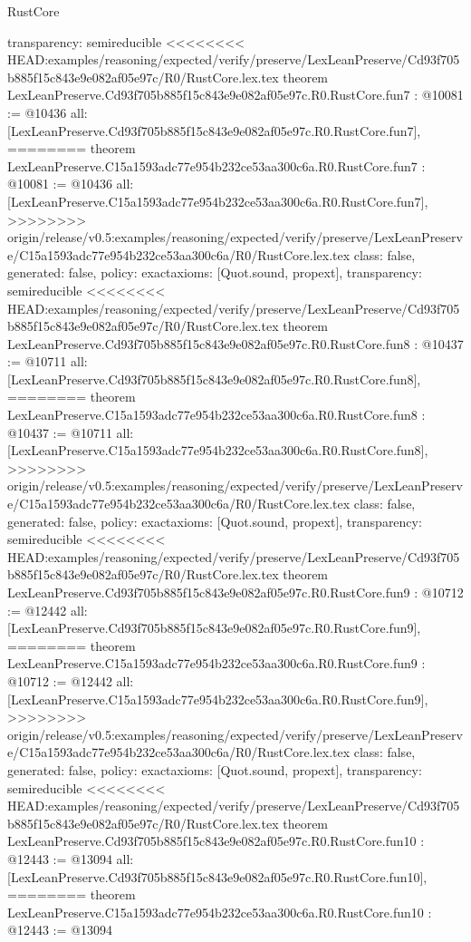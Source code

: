 \begin{lexlean}{RustCore}
\begin{coremodule}
{\begin{coremodule}
{{{{{{{{{{  transparency: semireducible
}
<<<<<<<< HEAD:examples/reasoning/expected/verify/preserve/LexLeanPreserve/Cd93f705b885f15c843e9e082af05e97c/R0/RustCore.lex.tex
theorem LexLeanPreserve.Cd93f705b885f15c843e9e082af05e97c.R0.RustCore.fun7 : @10081 := @10436 {
  all: [LexLeanPreserve.Cd93f705b885f15c843e9e082af05e97c.R0.RustCore.fun7],
========
theorem LexLeanPreserve.C15a1593adc77e954b232ce53aa300c6a.R0.RustCore.fun7 : @10081 := @10436 {
  all: [LexLeanPreserve.C15a1593adc77e954b232ce53aa300c6a.R0.RustCore.fun7],
>>>>>>>> origin/release/v0.5:examples/reasoning/expected/verify/preserve/LexLeanPreserve/C15a1593adc77e954b232ce53aa300c6a/R0/RustCore.lex.tex
  class: false,
  generated: false,
  policy: exact{axioms: [Quot.sound, propext]},
  transparency: semireducible
}
<<<<<<<< HEAD:examples/reasoning/expected/verify/preserve/LexLeanPreserve/Cd93f705b885f15c843e9e082af05e97c/R0/RustCore.lex.tex
theorem LexLeanPreserve.Cd93f705b885f15c843e9e082af05e97c.R0.RustCore.fun8 : @10437 := @10711 {
  all: [LexLeanPreserve.Cd93f705b885f15c843e9e082af05e97c.R0.RustCore.fun8],
========
theorem LexLeanPreserve.C15a1593adc77e954b232ce53aa300c6a.R0.RustCore.fun8 : @10437 := @10711 {
  all: [LexLeanPreserve.C15a1593adc77e954b232ce53aa300c6a.R0.RustCore.fun8],
>>>>>>>> origin/release/v0.5:examples/reasoning/expected/verify/preserve/LexLeanPreserve/C15a1593adc77e954b232ce53aa300c6a/R0/RustCore.lex.tex
  class: false,
  generated: false,
  policy: exact{axioms: [Quot.sound, propext]},
  transparency: semireducible
}
<<<<<<<< HEAD:examples/reasoning/expected/verify/preserve/LexLeanPreserve/Cd93f705b885f15c843e9e082af05e97c/R0/RustCore.lex.tex
theorem LexLeanPreserve.Cd93f705b885f15c843e9e082af05e97c.R0.RustCore.fun9 : @10712 := @12442 {
  all: [LexLeanPreserve.Cd93f705b885f15c843e9e082af05e97c.R0.RustCore.fun9],
========
theorem LexLeanPreserve.C15a1593adc77e954b232ce53aa300c6a.R0.RustCore.fun9 : @10712 := @12442 {
  all: [LexLeanPreserve.C15a1593adc77e954b232ce53aa300c6a.R0.RustCore.fun9],
>>>>>>>> origin/release/v0.5:examples/reasoning/expected/verify/preserve/LexLeanPreserve/C15a1593adc77e954b232ce53aa300c6a/R0/RustCore.lex.tex
  class: false,
  generated: false,
  policy: exact{axioms: [Quot.sound, propext]},
  transparency: semireducible
}
<<<<<<<< HEAD:examples/reasoning/expected/verify/preserve/LexLeanPreserve/Cd93f705b885f15c843e9e082af05e97c/R0/RustCore.lex.tex
theorem LexLeanPreserve.Cd93f705b885f15c843e9e082af05e97c.R0.RustCore.fun10 : @12443 := @13094 {
  all: [LexLeanPreserve.Cd93f705b885f15c843e9e082af05e97c.R0.RustCore.fun10],
========
theorem LexLeanPreserve.C15a1593adc77e954b232ce53aa300c6a.R0.RustCore.fun10 : @12443 := @13094 {
}}}}}}}}}}}}}}
\end{coremodule}}
\end{coremodule}
\end{lexlean}
